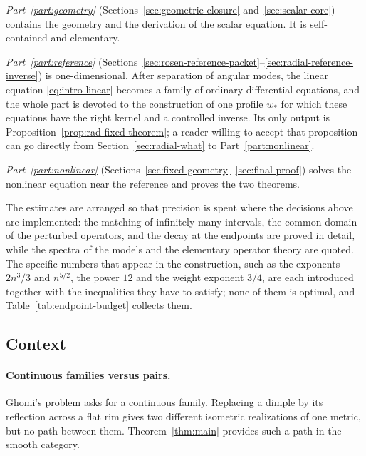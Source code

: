 \emph{Part~\ref{part:geometry}} (Sections~\ref{sec:geometric-closure}
and~\ref{sec:scalar-core}) contains the geometry and the derivation of
the scalar equation. It is self-contained and elementary.

\emph{Part~\ref{part:reference}}
(Sections~\ref{sec:rosen-reference-packet}--\ref{sec:radial-reference-inverse})
is one-dimensional. After separation of angular modes, the linear
equation \eqref{eq:intro-linear} becomes a family of ordinary
differential equations, and the whole part is devoted to the
construction of one profile $w_*$ for which these equations have the
right kernel and a controlled inverse. Its only output is
Proposition~\ref{prop:rad-fixed-theorem}; a reader willing to accept
that proposition can go directly from Section~\ref{sec:radial-what}
to Part~\ref{part:nonlinear}.

\emph{Part~\ref{part:nonlinear}}
(Sections~\ref{sec:fixed-geometry}--\ref{sec:final-proof}) solves the
nonlinear equation near the reference and proves the two theorems.

The estimates are arranged so that precision is spent where the
decisions above are implemented: the matching of infinitely many
intervals, the common domain of the perturbed operators, and the decay
at the endpoints are proved in detail, while the spectra of the models
and the elementary operator theory are quoted. The specific numbers
that appear in the construction, such as the exponents $2n^3/3$ and
$n^{5/2}$, the power $12$ and the weight exponent $3/4$, are each
introduced together with the inequalities they have to satisfy; none
of them is optimal, and Table~\ref{tab:endpoint-budget} collects them.

\subsection{Context}

\paragraph{Continuous families versus pairs.}
Ghomi's problem \cite[Problem~1.1]{Ghomi2019} asks for a continuous
family. Replacing a dimple by its reflection across a flat rim gives
two different isometric realizations of one metric, but no path between
them. Theorem~\ref{thm:main} provides such a path in the smooth
category.

